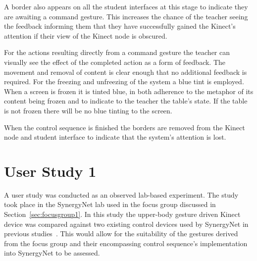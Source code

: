 \documentclass[manuscript, review, screen]{acmart}
\begin{document}
A border also appears on all the student interfaces at this stage to indicate they are awaiting a command gesture.
This increases the chance of the teacher seeing the feedback informing them that they have successfully gained the Kinect's attention if their view of the Kinect node is obscured.

For the actions resulting directly from a command gesture the teacher can visually see the effect of the completed action as a form of feedback.
The movement and removal of content is clear enough that no additional feedback is required.
For the freezing and unfreezing of the system a blue tint is employed.
When a screen is frozen it is tinted blue, in both adherence to the metaphor of its content being frozen and to indicate to the teacher the table's state.
If the table is not frozen there will be no blue tinting to the screen.

When the control sequence is finished the borders are removed from the Kinect node and student interface to indicate that the system's attention is lost.


\section{User Study 1}
\label{sec:evaluation1}


A user study was conducted as an observed lab-based experiment.
The study took place in the SynergyNet lab used in the focus group discussed in Section~\ref{sec:focusgroup1}.
In this study the upper-body gesture driven Kinect device was compared against two existing control devices used by SynergyNet in previous studies~\cite{Mercier2012}.
This would allow for the suitability of the gestures derived from the focus group and their encompassing control sequence's implementation into SynergyNet to be assessed.
\end{document}

